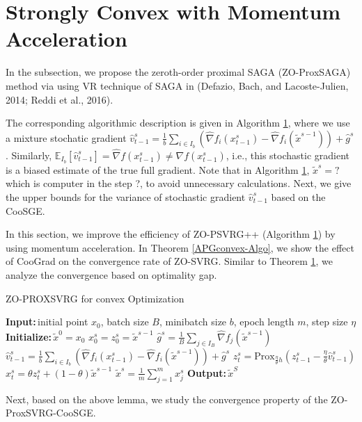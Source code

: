 \documentclass{article}
\newcommand*{\Po}{\text{Prox}}
\newcommand*{\E}{\mathbb{E}}
\newcommand{\Initialize}{\textbf{Initialize:}{\,}}
\newcommand{\Input}{\textbf{Input:}{\,}}
\newcommand{\Output}{\textbf{Output:}{\,}}
\theoremstyle{definition}
\theoremstyle{remark}
\begin{document}
\section{Strongly Convex with Momentum Acceleration}
{\color{Green}

In the subsection, we propose the zeroth-order proximal SAGA (ZO-ProxSAGA) method via using VR technique of SAGA in (Defazio, Bach, and Lacoste-Julien, 2014; Reddi et al., 2016).

The corresponding algorithmic description is given in Algorithm \ref{}, where we use a mixture
stochatic gradient ${\hat{v}}_{t-1}^s = \frac{1}{b} \sum_{i\in I_b}\left(\hat{\nabla} f_{i}(x_{t-1}^s)-\hat{\nabla} f_{i}(\tilde{x}^{s-1})\right)+\hat{g}^s$. Similarly, $\E_{I_b}[\hat{v}_{t-1}^s] = \hat{\nabla} f(x_{t-1}^s) \neq {\nabla} f(x_{t-1}^s)$, i.e., this stochastic gradient is a biased
estimate of the true full gradient. Note that in Algorithm \ref{}, $\widetilde{x}^s = ?$ which is computer in the step ?, to avoid unnecessary calculations. Next, we give the upper bounds for the variance of stochastic gradient $\hat{v}_{t-1}^s$ based on the CooSGE.
}

In this section, we improve the efficiency of ZO-PSVRG++ (Algorithm \ref{}) by using momentum acceleration.
In Theorem \ref{APGconvex-Algo}, we show the effect of CooGrad on the convergence rate of ZO-SVRG. Similar to
Theorem \ref{}, we analyze the convergence based on optimality gap.
\begin{algorithm}\label{APGconvex-Algo}
\caption{ZO-PROXSVRG for convex Optimization}\begin{algorithmic}[1]
\State\Input initial point $x_0$, batch size $B$, minibatch size $b$, epoch length $m$, step size $\eta$
\State\Initialize $\tilde{x}^0 = x_0$
\State $x_0^s = z_0^s = \widetilde{x}^{s-1}$
\State $\hat{g}^s = \frac{1}{B} \sum_{j\in I_B} \hat{\nabla} f_j (\widetilde{x}^{s-1})$
\State $\hat{v}_{t-1}^s = \frac{1}{b} \sum_{i\in I_b}\left(\hat{\nabla} f_{i}(x_{t-1}^s)-\hat{\nabla} f_{i}(\tilde{x}^{s-1})\right)+\hat{g}^s$
\State $z_{t}^s= \Po_{\frac{\eta}{\theta} h}(z_{t-1}^s - \frac{\eta}{\theta} \hat{v}_{t-1}^s)$
\State $x_{t}^s = \theta z_{t}^s+(1-\theta)\widetilde{x}^{s-1}$
\EndFor
\State $\tilde{x}^s=\frac{1}{m}\sum_{j=1}^{m}x_j^s$ 
 \EndFor
 \State\Output ${\tilde{x}}^{S}$
\end{algorithmic}
\end{algorithm}
{\color{Green}
Next, based on the above lemma, we study the convergence property of the ZO-ProxSVRG-CooSGE.
}
\end{document}
